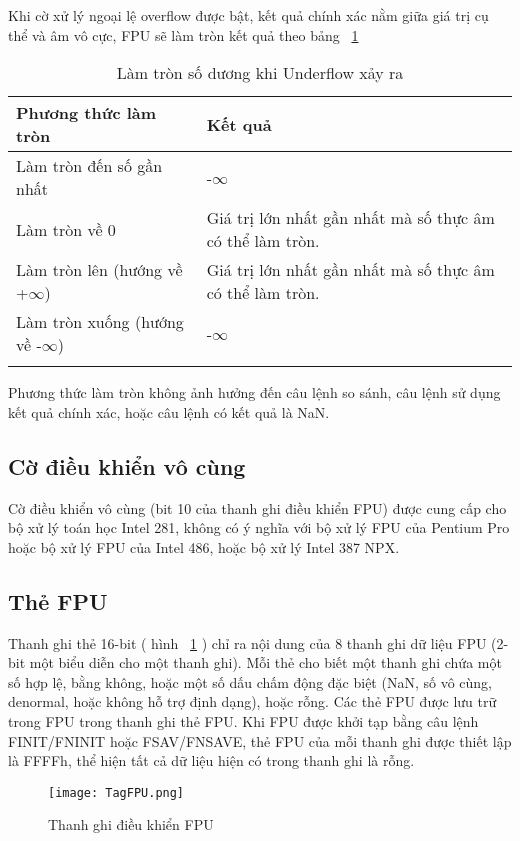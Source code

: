 	Khi cờ xử lý ngoại lệ overflow được bật, kết quả chính xác nằm giữa giá trị cụ thể  và âm vô cực, FPU sẽ làm tròn kết quả theo bảng ~\ref{tb:RCUnderflow}
		\begin{longtable} {|m{6cm}|m{6cm}|}
			\hline
				Phương thức làm tròn & Kết quả \\			
			\hline						
			\hline
				Làm tròn đến số gần nhất & -$\mathbf{\infty}$\\
			\hline
				Làm tròn về 0 & Giá trị lớn nhất gần nhất mà số thực âm có thể làm tròn.\\
			\hline
				Làm tròn lên (hướng về +$\mathbf{\infty}$) &  Giá trị lớn nhất gần nhất mà số thực âm có thể làm tròn.\\
			\hline
				Làm tròn xuống (hướng về -$\mathbf{\infty}$) & 	-$\mathbf{\infty}$\\
			\hline			
			\caption{Làm tròn số dương khi Underflow xảy ra}
			\label{tb:RCUnderflow}
		\end{longtable}		
		Phương thức làm tròn không ảnh hưởng đến câu lệnh so sánh, câu lệnh sử dụng kết quả chính xác, hoặc câu lệnh có kết quả là NaN.
		
		\subsection*{Cờ điều khiển vô cùng}
		Cờ điều khiển vô cùng (bit 10 của thanh ghi điều khiển FPU) được cung cấp cho bộ xử lý toán học Intel 281, không có ý nghĩa với bộ xử lý FPU của Pentium Pro hoặc bộ xử lý FPU của Intel 486, hoặc bộ xử lý Intel 387 NPX.
		
		\subsection*{Thẻ FPU}
		Thanh ghi thẻ 16-bit ( hình ~\ref{fig:TagFPU} ) chỉ ra nội dung của 8 thanh ghi dữ liệu FPU (2-bit một biểu diễn cho một thanh ghi). Mỗi thẻ cho biết một thanh ghi chứa một số hợp lệ, bằng không, hoặc một số dấu chấm động đặc biệt (NaN, số vô cùng, denormal, hoặc không hỗ trợ định dạng), hoặc rỗng. Các thẻ FPU được lưu trữ trong FPU trong thanh ghi thẻ FPU. Khi FPU được khởi tạp bằng câu lệnh FINIT/FNINIT hoặc FSAV/FNSAVE, thẻ FPU của mỗi thanh ghi được thiết lập là FFFFh, thể hiện tất cả dữ liệu hiện có trong thanh ghi là rỗng.
		\begin{center}
			\begin{figure}[htp]
				\begin{center}
					\texttt{[image: TagFPU.png]}
				\end{center}
				\caption{Thanh ghi điều khiển FPU}				
				\label{fig:TagFPU}				
			\end{figure}
		\end{center}	

